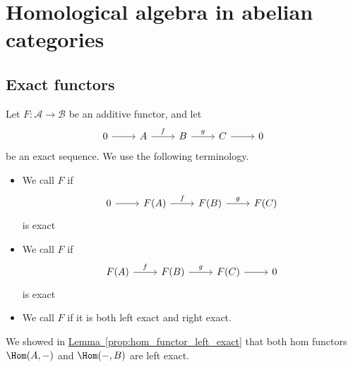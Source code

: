 \documentclass[main.tex]{subfiles}
\begin{document}
\chapter{Homological algebra in abelian categories}
\label{ch:homological_algebra_in_abelian_categories}

\section{Exact functors}
\label{sec:exact_functors}

\begin{definition}
  \label{def:exact_functor}
  Let $F\colon \mathcal{A} \to \mathcal{B}$ be an additive functor, and let
  \begin{equation*}
    \begin{tikzcd}
      0
      \arrow[r]
      & A
      \arrow[r, "f"]
      & B
      \arrow[r, "g"]
      & C
      \arrow[r]
      & 0
    \end{tikzcd}
  \end{equation*}
  be an exact sequence. We use the following terminology.
  \begin{itemize}
    \item We call $F$  if
      \begin{equation*}
        \begin{tikzcd}
          0
          \arrow[r]
          & F(A)
          \arrow[r, "f"]
          & F(B)
          \arrow[r, "g"]
          & F(C)
        \end{tikzcd}
      \end{equation*}
      is exact

    \item We call $F$  if
      \begin{equation*}
        \begin{tikzcd}
          F(A)
          \arrow[r, "f"]
          & F(B)
          \arrow[r, "g"]
          & F(C)
          \arrow[r]
          & 0
        \end{tikzcd}
      \end{equation*}
      is exact

    \item We call $F$  if it is both left exact and right exact.
  \end{itemize}
\end{definition}

\begin{example}
  We showed in \hyperref[prop:hom_functor_left_exact]{Lemma~\ref*{prop:hom_functor_left_exact}} that both hom functors $\Hom(A, -)$ and $\Hom(-, B)$ are left exact.
\end{example}
\end{document}
